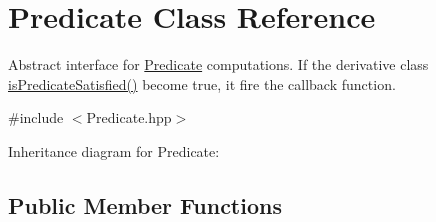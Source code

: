 \hypertarget{classPredicate}{}\section{Predicate Class Reference}
\label{classPredicate}


Abstract interface for \hyperlink{classPredicate}{Predicate} computations. If the derivative class\textquotesingle{} \hyperlink{classPredicate_a5734faf53a034e3521f6305c1b3c02d1}{is\+Predicate\+Satisfied()} become true, it fire the callback function.  




{\ttfamily \#include $<$Predicate.\+hpp$>$}



Inheritance diagram for Predicate\+:
\subsection*{Public Member Functions}
